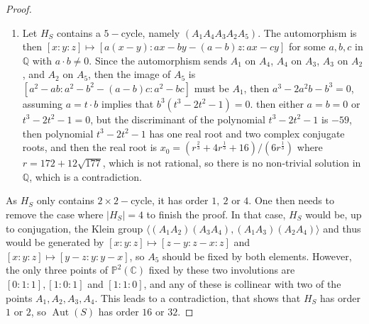 \documentclass[leqno,12pt]{amsart} %
\newcommand{\Q}{\ensuremath{\mathbb{Q} }}
\newcommand{\C}{\ensuremath{\mathbb{C} }}
\newcommand{\p}{\ensuremath{\mathbb{P} }}
\DeclareMathOperator{\Aut}{Aut}
\begin{document}
\begin{proof}
\begin{enumerate}
\item Let $H_S$ contains a $5-$cycle, namely $(A_1 A_4A_3A_2A_5)$. The automorphism is then $[x : y : z] \mapsto [a(x-y) : ax-b y-(a-b)z : ax-cy]$ for some $a,b,c$ in $\Q $ with $a\cdot b\neq0$. Since the automorphism sends $A_1$ on $A_4$, $A_4$ on $A_3$, $A_3$ on $A_2$, and $A_2$ on $A_5$, then the image of $A_5$ is $[a^2-ab:a^2-b^2-(a-b)c:a^2-bc]$ must be $A_1$, then $a^3-2a^2b-b^3=0$, assuming $a=t\cdot b$ implies that $b^3(t^{3}-2 t^{2}-1)=0$. then either $a=b=0$ or $t^{3}-2 t^{2}-1=0$, but the discriminant of the polynomial $t^{3}-2 t^{2}-1$ is $-59$, then polynomial $t^{3}-2 t^{2}-1$ has one real root and two complex conjugate roots, and then the real root is $x_0=(r^{\frac{2}{3}}+4 r^{\frac{1}{3}}+16)/(6 r^{\frac{1}{3}})$ where $r=172+12 \sqrt{177}$, which is not rational, so there is no non-trivial solution in $\Q $, which is a contradiction.\end{enumerate}

As $H_S$ only contains $2\times2-$cycle, it has order $1,~2$ or $4$. One then needs to remove the case where $\mid H_S\mid =4$ to finish the proof. In that case, $H_S$ would be, up to conjugation, the Klein group $\langle(A_1 A_2)(A_3 A_4), (A_1 A_3)(A_2 A_4)\rangle $  and thus would be generated by $[x:y:z]\mapsto[z-y:z-x:z]$ and $[x:y:z]\mapsto[y-z:y:y-x]$, so $A_5$ should be fixed by both elements. However, the only three points of $\p^2(\C)$ fixed by these two involutions are $[0:1:1],[1:0:1]$ and $[1:1:0]$, and any of these is collinear with two of the points $A_1,A_2,A_3,A_4$. This leads to a contradiction, that shows that $H_S$ has order $1$ or $2$, so $\Aut(S)$ has order $16$ or $32$.
\end{proof}
 
\end{document}

